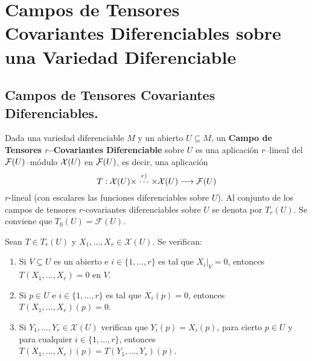 \documentclass[cursovd_portada.tex]{subfiles}
\begin{document}
\chapter{Campos de Tensores\\ Covariantes Diferenciables sobre una Va\-rie\-dad Diferenciable}
\section{Campos de Tensores Covariantes Diferenciables.}
\begin{defi}
Dada una variedad diferenciable $M$ y un abierto $U\subseteq M$, un {\bf Campo de Tensores $r$--Covariantes
Diferenciable} sobre $U$ es una aplicación $r$--lineal del ${\cal F}(U)$--módulo ${\cal X}(U)$ en ${\cal F}(U)$, es
decir, una aplicación
$$T:{\cal X}(U)\times\stackrel{r)}\cdots\times\mathcal{X}(U)\longrightarrow\mathcal{F}(U)$$
$r$-lineal (con escalares las funciones diferenciables sobre $U$). Al conjunto de los campos de tensores
$r$-covariantes diferenciables sobre $U$ se denota por $T_r(U)$. Se conviene que $T_0(U)=\mathcal{F}(U)$.
\end{defi}
\begin{prop}
Sean $T\in T_r(U)$ y $X_1,\dots ,X_r\in\mathcal{X}(U)$. Se verifican:
\begin{enumerate}
\item Si $V\subseteq U$ es un abierto e $i\in\{1,\dots ,r\}$ es tal que $X_i|_V=0$, entonces $T(X_1,\dots ,X_r)=0$
en $V$.
\item Si $p\in U$ e $i\in\{1,\dots ,r\}$ es tal que $X_i(p)=0$, entonces $T(X_1,\dots ,X_r)(p)=0$.
\item Si $Y_1,\dots ,Y_r\in\mathcal{X}(U)$ verifican que $Y_i(p)=X_i(p)$, para cierto $p\in U$ y para cualquier
$i\in\{1,\dots ,r\}$, entonces $T(X_1,\dots ,X_r)(p)=T(Y_1,\dots ,Y_r)(p)$.
\end{enumerate}
\end{prop}
\end{document}
